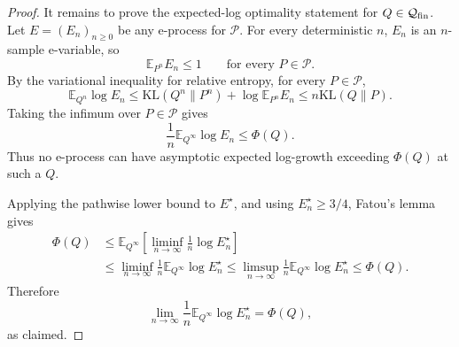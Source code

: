\documentclass[11pt]{article}
\newcommand{\KL}{\mathrm{KL}}
\newcommand{\Pcal}{\mathcal{P}}
\newcommand{\X}{\mathsf{X}}
\theoremstyle{definition}
\theoremstyle{definition}
\begin{document}
\begin{proof}
It remains to prove the expected-log optimality statement for \(Q\in\mathcal Q_{\rm fin}\). Let
\(E=(E_n)_{n\ge0}\) be any e-process for \(\mathcal P\). For every deterministic \(n\), \(E_n\) is an
\(n\)-sample e-variable, so
\[
  \mathbb E_{P^n}E_n\le1
  \qquad\text{for every }P\in\mathcal P.
\]
By the variational inequality for relative entropy, for every \(P\in\mathcal P\),
\[
  \mathbb E_{Q^n}\log E_n
  \le
  \KL(Q^n\|P^n)+\log\mathbb E_{P^n}E_n
  \le
  n\KL(Q\|P).
\]
Taking the infimum over \(P\in\mathcal P\) gives
\[
  \frac1n\mathbb E_{Q^\infty}\log E_n
  \le
  \Phi(Q).
\]
Thus no e-process can have asymptotic expected log-growth exceeding \(\Phi(Q)\) at such a \(Q\).

Applying the pathwise lower bound to \(E^\star\), and using \(E^\star_n\ge3/4\), Fatou's lemma gives
\[
\begin{aligned}
  \Phi(Q)
  &\le
  \mathbb E_{Q^\infty}
  \left[
    \liminf_{n\to\infty}
    \frac1n\log E^\star_n
  \right]  \\
  &\le
  \liminf_{n\to\infty}
  \frac1n\mathbb E_{Q^\infty}\log E^\star_n
  \le
  \limsup_{n\to\infty}
  \frac1n\mathbb E_{Q^\infty}\log E^\star_n
  \le
  \Phi(Q).
\end{aligned}
\]
Therefore
\[
  \lim_{n\to\infty}
  \frac1n\mathbb E_{Q^\infty}\log E^\star_n
  =
  \Phi(Q),
\]
as claimed.
\end{proof}


\end{document}
